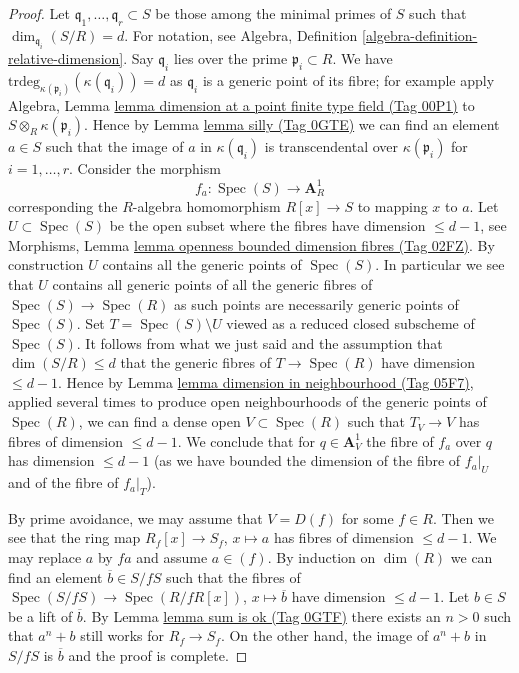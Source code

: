 \documentclass{amsart}
\theoremstyle{plain}
\theoremstyle{definition}
\theoremstyle{remark}
\numberwithin{equation}{subsection}
\def\Spec{\mathop{\mathrm{Spec}}}
\begin{document}
\begin{proof}
\medskip\noindent
Let $\mathfrak q_1, \ldots, \mathfrak q_r \subset S$ be those
among the minimal primes of $S$ such that $\dim_{\mathfrak q_i}(S/R) = d$.
For notation, see
Algebra, Definition \ref{algebra-definition-relative-dimension}.
Say $\mathfrak q_i$ lies over the prime $\mathfrak p_i \subset R$.
We have $\text{trdeg}_{\kappa(\mathfrak p_i)}(\kappa(\mathfrak q_i)) = d$
as $\mathfrak q_i$ is a generic point of its fibre; for example
apply Algebra, Lemma \href{https://stacks.math.columbia.edu/tag/00P1}{lemma dimension at a point finite type field (Tag 00P1)}
to $S \otimes_R \kappa(\mathfrak p_i)$.
Hence by Lemma \href{https://stacks.math.columbia.edu/tag/0GTE}{lemma silly (Tag 0GTE)} we can find an element $a \in S$ such that
the image of $a$ in $\kappa(\mathfrak q_i)$ is transcendental over
$\kappa(\mathfrak p_i)$ for $i = 1, \ldots, r$.
Consider the morphism
$$
f_a : \Spec(S) \longrightarrow \mathbf{A}^1_R
$$
corresponding the $R$-algebra homomorphism $R[x] \to S$
to mapping $x$ to $a$. Let $U \subset \Spec(S)$ be the open
subset where the fibres have dimension $\leq d - 1$, see
Morphisms, Lemma \href{https://stacks.math.columbia.edu/tag/02FZ}{lemma openness bounded dimension fibres (Tag 02FZ)}.
By construction $U$ contains all the generic points of $\Spec(S)$.
In particular we see that $U$ contains all generic points of
all the generic fibres of $\Spec(S) \to \Spec(R)$ as such points are
necessarily generic points of $\Spec(S)$. Set $T = \Spec(S) \setminus U$
viewed as a reduced closed subscheme of $\Spec(S)$.
It follows from what we just said and the assumption that
$\dim(S/R) \leq d$ that
the generic fibres of $T \to \Spec(R)$ have dimension $\leq d - 1$.
Hence by Lemma \href{https://stacks.math.columbia.edu/tag/05F7}{lemma dimension in neighbourhood (Tag 05F7)},
applied several times to produce open neighbourhoods of the generic
points of $\Spec(R)$, we can find a dense open $V \subset \Spec(R)$ such that
$T_V \to V$ has fibres of dimension $\leq d - 1$.
We conclude that for $q \in \mathbf{A}^1_V$ the fibre of
$f_a$ over $q$ has dimension $\leq d - 1$ (as we have bounded the dimension
of the fibre of $f_a|_U$ and of the fibre of $f_a|_T$).

\medskip\noindent
By prime avoidance, we may assume that $V = D(f)$ for some $f \in R$.
Then we see that the ring map $R_f[x] \to S_f$, $x \mapsto a$
has fibres of dimension $\leq d - 1$.
We may replace $a$ by $fa$ and assume $a \in (f)$.
By induction on $\dim(R)$ we can find an element
$\overline{b} \in S/fS$
such that the fibres of $\Spec(S/fS) \to \Spec(R/fR[x])$,
$x \mapsto \overline{b}$ have dimension $\leq d - 1$.
Let $b \in S$ be a lift of $\overline{b}$.
By Lemma \href{https://stacks.math.columbia.edu/tag/0GTF}{lemma sum is ok (Tag 0GTF)} there exists an $n > 0$ such
that $a^n + b$ still works for $R_f \to S_f$.
On the other hand, the image of $a^n + b$ in $S/fS$ is $\overline{b}$
and the proof is complete.
\end{proof}
\end{document}
